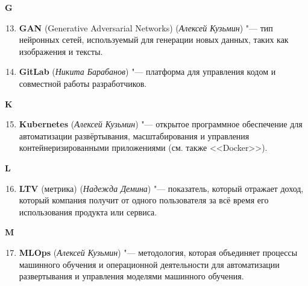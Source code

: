 \begin{flushleft} \large\textbf{G} \end{flushleft}

\begin{enumerate}
    \setcounter{enumi}{12}

    \item \textbf{GAN} (Generative Adversarial Networks) (\textit{Алексей Кузьмин}) "--- 
    тип нейронных сетей, используемый для генерации новых данных, таких как изображения и тексты. 

    \item \textbf{GitLab} (\textit{Никита Барабанов}) "--- 
    платформа для управления кодом и совместной работы разработчиков.
\end{enumerate}

\begin{flushleft} \large\textbf{K} \end{flushleft}

\begin{enumerate}
    \setcounter{enumi}{14}

    \item \textbf{Kubernetes} (\textit{Алексей Кузьмин}) "--- 
    открытое программное обеспечение для автоматизации развёртывания, масштабирования и управления контейнеризированными приложениями (см. также <<Docker>>).
\end{enumerate}

\begin{flushleft} \large\textbf{L} \end{flushleft}

\begin{enumerate}
    \setcounter{enumi}{15}

    \item \textbf{LTV} (метрика) (\textit{Надежда Демина}) "--- 
    показатель, который отражает доход, который компания получит от одного пользователя за всё время его использования продукта или сервиса.
\end{enumerate}

\begin{flushleft} \large\textbf{M} \end{flushleft}

\begin{enumerate}
    \setcounter{enumi}{16}

    \item \textbf{MLOps} (\textit{Алексей Кузьмин}) "--- 
    методология, которая объединяет процессы машинного обучения и операционной деятельности для автоматизации развертывания и управления моделями машинного обучения.
\end{enumerate}

